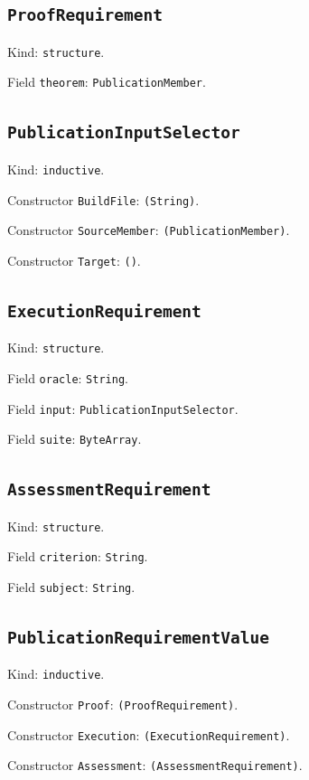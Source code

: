 \documentclass[11pt]{article}
\begin{document}
\subsection*{\texttt{ProofRequirement}}
\noindent Kind: \texttt{structure}.\par
\noindent Field \texttt{theorem}: \texttt{PublicationMember}.\par
\subsection*{\texttt{PublicationInputSelector}}
\noindent Kind: \texttt{inductive}.\par
\noindent Constructor \texttt{BuildFile}: \texttt{(String)}.\par
\noindent Constructor \texttt{SourceMember}: \texttt{(PublicationMember)}.\par
\noindent Constructor \texttt{Target}: \texttt{()}.\par
\subsection*{\texttt{ExecutionRequirement}}
\noindent Kind: \texttt{structure}.\par
\noindent Field \texttt{oracle}: \texttt{String}.\par
\noindent Field \texttt{input}: \texttt{PublicationInputSelector}.\par
\noindent Field \texttt{suite}: \texttt{ByteArray}.\par
\subsection*{\texttt{AssessmentRequirement}}
\noindent Kind: \texttt{structure}.\par
\noindent Field \texttt{criterion}: \texttt{String}.\par
\noindent Field \texttt{subject}: \texttt{String}.\par
\subsection*{\texttt{PublicationRequirementValue}}
\noindent Kind: \texttt{inductive}.\par
\noindent Constructor \texttt{Proof}: \texttt{(ProofRequirement)}.\par
\noindent Constructor \texttt{Execution}: \texttt{(ExecutionRequirement)}.\par
\noindent Constructor \texttt{Assessment}: \texttt{(AssessmentRequirement)}.\par
\end{document}
